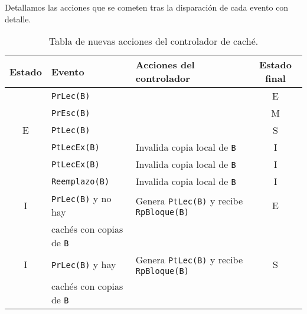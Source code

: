Detallamos las acciones que se cometen tras la disparación de cada evento con detalle.

\begin{table}
\centering
\begin{tabular}{c l l c}
    \toprule
    Estado & Evento & Acciones del controlador & Estado final \\
    \toprule
       & \verb|PrLec(B)| & & E \\
    \midrule
       & \verb|PrEsc(B)| & & M \\
    \midrule
    E  & \verb|PtLec(B)| & & S \\
    \midrule
       & \verb|PtLecEx(B)| & Invalida copia local de \verb|B| & I \\
    \midrule
       & \verb|PtLecEx(B)| & Invalida copia local de \verb|B| & I \\
    \midrule
       & \verb|Reemplazo(B)| & Invalida copia local de \verb|B| & I \\
    \bottomrule
    I & \verb|PrLec(B)| y no hay & Genera \verb|PtLec(B)| y recibe \verb|RpBloque(B)| & E \\
      & cachés con copias de \verb|B| & & \\
    \midrule
    I & \verb|PrLec(B)| y hay & Genera \verb|PtLec(B)| y recibe \verb|RpBloque(B)| & S \\
      & cachés con copias de \verb|B| & & \\
    \bottomrule
\end{tabular}
\caption{Tabla de nuevas acciones del controlador de caché.}
\label{tab:acciones_controlador_MESI}
\end{table}

